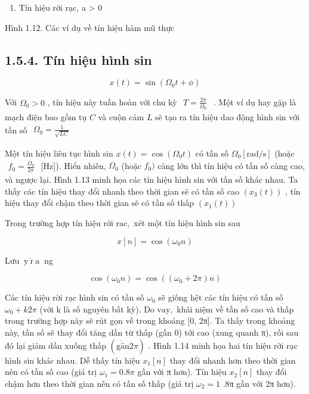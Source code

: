 \documentclass[
  10
]{article}
\providecommand{\tightlist}{%
  \setlength{\itemsep}{0pt}\setlength{\parskip}{0pt}}
\begin{document}
\begin{enumerate}
\def\labelenumi{(\alph{enumi})}
\setcounter{enumi}{3}
\tightlist
\item
  Tín hiệu rời rạc, a \textgreater{} 0
\end{enumerate}

Hình 1.12. Các ví dụ về tín hiệu hàm mũ thực

\subsection{1.5.4. Tín hiệu hình
sin}\label{tuxedn-hiux1ec7u-huxecnh-sin}

\[
x (t) = \sin (\Omega_ {0} t + \phi)
\]

Với \(\Omega _ { 0 } > 0\) , tín hiệu này tuần hoàn với chu kỳ
\(\begin{array} { r } { T = \frac { 2 \pi } { \Omega _ { 0 } } } \end{array}\)
. Một ví dụ hay gặp là mạch điện bao gồm tụ \(C\) và cuộn cảm \(L\) sẽ
tạo ra tín hiệu dao động hình sin với tần số
\(\begin{array} { r } { \Omega _ { 0 } = \frac { 1 } { \sqrt { L C } } } \end{array}\)

Một tín hiệu liên tục hình sin \(x ( t ) = \cos ( \Omega _ { 0 } t )\)
có tần số \(\Omega _ { 0 } [ \mathrm { r a d / s } ]\) (hoặc
\(\begin{array} { r } { f _ { 0 } = \frac { \Omega _ { 0 } } { 2 \pi } } \end{array}\)
{[}Hz{]}). Hiển nhiên, \(\Omega _ { 0 }\) (hoặc \(f _ { 0 } )\) càng lớn
thì tín hiệu có tần số càng cao, và ngược lại. Hình 1.13 minh họa các
tín hiệu hình sin với tần số khác nhau. Ta thấy các tín hiệu thay đổi
nhanh theo thời gian sẽ có tần số cao \(\left( x _ { 3 } ( t ) \right)\)
, tín hiệu thay đổi chậm theo thời gian sẽ có tần số thấp
\(( x _ { 1 } ( t ) )\)

Trong trường hợp tín hiệu rời \(\mathrm { r a c } ,\) xét một tín hiệu
hình sin sau

\[
x [ n ] = \cos (\omega_ {0} n)
\]

Lưu \(\acute { \mathrm { ~ y ~ r ~ a ~ } }\) ng

\[
\cos (\omega_ {0} n) = \cos ((\omega_ {0} + 2 \pi) n)
\]

Các tín hiệu rời rạc hình sin có tần số \(\omega _ { 0 }\) sẽ giống hệt
các tín hiệu có tần số \(\omega _ { 0 } + k 2 \pi\) (với k là số nguyên
bất kỳ). Do \(\mathrm { v a y } ,\) khái niệm về tần số cao và thấp
trong trường hợp này sẽ rút gọn về trong khoảng {[}0, 2π{]}. Ta thấy
trong khoảng này, tần số sẽ thay đổi tăng dần từ thấp (gần 0) tới cao
(xung quanh π), rồi sau đó lại giảm dần xuống thấp
\(( \mathrm { g } \dot { \hat { \mathrm { a } } } \mathrm { n } 2 \pi )\)
. Hình 1.14 minh họa hai tín hiệu rời rạc hình sin khác nhau. Dễ thấy
tín hiệu \(x _ { 1 } [ n ]\) thay đổi nhanh hơn theo thời gian nên có
tần số cao (giá trị \(\omega _ { 1 } = 0 . 8 \pi\) gần với π hơn). Tín
hiệu \(x _ { 2 } [ n ]\) thay đổi chậm hơn theo thời gian nên có tần số
thấp (giá trị \(\omega _ { 2 } = 1\) .8π gần với 2π hơn).
\end{document}
